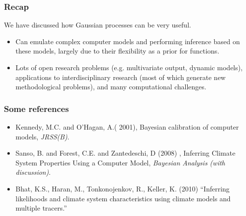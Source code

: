 \documentclass{beamer}
\begin{document}
\begin{frame}
  \frametitle{Recap}
 We have discussed how Gaussian processes can be very useful.
  \begin{itemize}
  \item Can emulate complex computer models and performing inference
    based on these models, largely due to their flexibility as a prior
    for functions.
  \item Lots of open research problems (e.g. multivariate output, dynamic
    models), applications to interdisciplinary research (most of which
    generate new methodological problems), and many computational
    challenges.
\end{itemize}
\end{frame}


\begin{frame}
  \frametitle{Some references }
{\small 
    \begin{itemize}
\item Kennedy, M.C. and O'Hagan, A.( 2001), Bayesian calibration of
  computer models, 
\textit{JRSS(B)}.
\item Sanso, B. and Forest, C.E. and Zantedeschi, D (2008) , Inferring Climate System Properties Using a Computer Model, \textit{Bayesian Analysis (with discussion)}.
\item {\color{blue} Bhat, K.S., Haran, M., Tonkonojenkov, R., Keller, K. (2010)
  ``Inferring likelihoods and climate system characteristics using
  climate models and multiple tracers.''}
      \end{itemize}
}
\end{frame}
\end{document}
